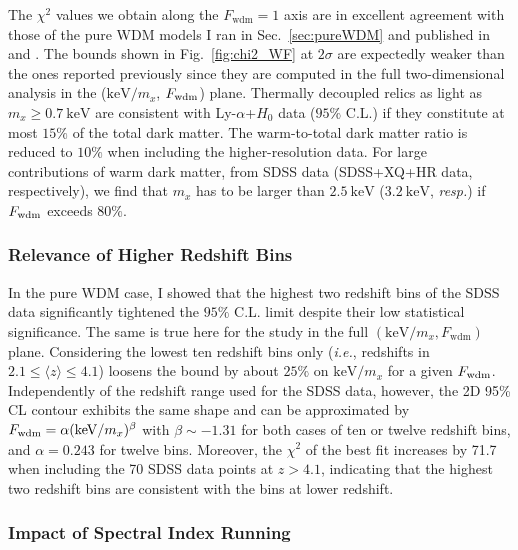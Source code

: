 The $\chi^2$ values we obtain along the $F_{\mathrm{wdm}}=1$ axis are in excellent agreement with those of the pure WDM models I ran in Sec.~\ref{sec:pureWDM} and published in \cite{Baur16} and \cite{Yeche17}. The bounds shown in Fig.~\ref{fig:chi2_WF} at $2\sigma$ are expectedly weaker than the ones reported previously since they are computed in the full two-dimensional analysis in the ($\mathrm{keV}/m_x$, $F_{\rm{wdm}}$) plane. Thermally decoupled relics as light as $m_x \geqslant 0.7~\mathrm{keV}$ are consistent with Ly-$\alpha$+$H_0$ data ($95\%$ C.L.) if they constitute at most $15\%$ of the total dark matter. The warm-to-total dark matter ratio is reduced to $10\%$ when including the higher-resolution data. For large contributions of warm dark matter, from SDSS data (SDSS+XQ+HR data, respectively), we find that $m_x$ has to be larger than $2.5~\mathrm{keV}$ ($3.2~\mathrm{keV}$, \textit{resp.}) if  $F_{\rm{wdm}}$ exceeds $80\%$. \\ 

\subsubsection{Relevance of Higher Redshift Bins}

In the pure WDM case, I showed that the highest two redshift bins of the SDSS data significantly tightened the $95\%$ C.L. limit despite their low statistical significance. The same is true here for the study in the full $\left( \mathrm{keV}/m_x, F_{\mathrm{wdm}} \right)$ plane. Considering  the lowest ten redshift bins only (\textit{i.e.}, redshifts in $2.1 \leqslant \langle z \rangle \leqslant 4.1$) loosens the  bound by about $25\%$ on $\mathrm{keV}/m_x$ for a given $F_{\rm{wdm}}$.  Independently of the redshift range used for the SDSS data, however, the  2D 95\% CL contour  exhibits the same shape and can  be approximated  by $F_{\rm{wdm}} = \alpha(\mathrm{keV}/m_x)^\beta$ with $\beta\sim -1.31$ for both cases of ten or twelve redshift bins, and $\alpha=0.243$ for twelve bins. Moreover, the $\chi^2$ of the best fit increases by 71.7 when including the 70 SDSS data points at $z>4.1$, indicating that the highest two redshift bins are consistent with the bins at lower redshift.  \\

\subsubsection{Impact of Spectral Index Running}

